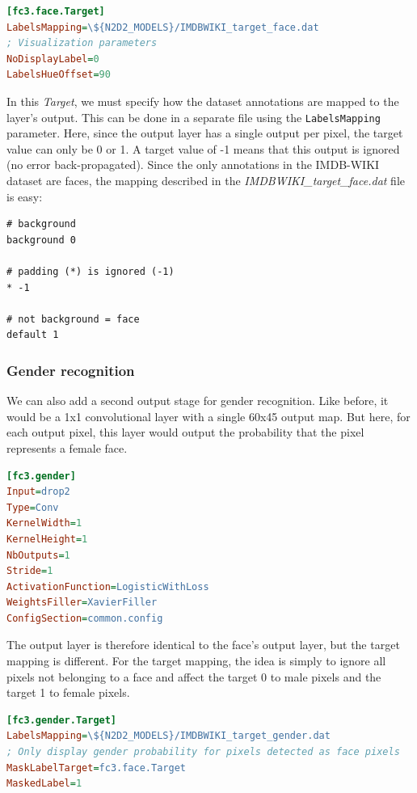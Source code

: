 \documentclass[a4paper,11pt,oneside]{article}
\begin{document}
\begin{lstlisting}[language=ini]
[fc3.face.Target]
LabelsMapping=\${N2D2_MODELS}/IMDBWIKI_target_face.dat
; Visualization parameters
NoDisplayLabel=0
LabelsHueOffset=90
\end{lstlisting}

In this \emph{Target}, we must specify how the dataset annotations are mapped to
the layer's output. This can be done in a separate file using the
\lstinline!LabelsMapping! parameter. Here, since the output layer has a single
output per pixel, the target value can only be 0 or 1. A target value of -1
means that this output is ignored (no error back-propagated). Since the only
annotations in the IMDB-WIKI dataset are faces, the mapping described in the
\emph{IMDBWIKI\_target\_face.dat} file is easy:

\begin{lstlisting}
# background
background 0

# padding (*) is ignored (-1)
* -1

# not background = face
default 1
\end{lstlisting}

\subsubsection{Gender recognition}

We can also add a second output stage for gender recognition. Like before, it
would be a 1x1 convolutional layer with a single 60x45 output map. But here, for
each output pixel, this layer would output the probability that the pixel
represents a female face.

\begin{lstlisting}[language=ini]
[fc3.gender]
Input=drop2
Type=Conv
KernelWidth=1
KernelHeight=1
NbOutputs=1
Stride=1
ActivationFunction=LogisticWithLoss
WeightsFiller=XavierFiller
ConfigSection=common.config
\end{lstlisting}

The output layer is therefore identical to the face's output layer, but the
target mapping is different. For the target mapping, the idea is simply to
ignore all pixels not belonging to a face and affect the target 0 to male pixels
and the target 1 to female pixels.

\begin{lstlisting}[language=ini]
[fc3.gender.Target]
LabelsMapping=\${N2D2_MODELS}/IMDBWIKI_target_gender.dat
; Only display gender probability for pixels detected as face pixels
MaskLabelTarget=fc3.face.Target
MaskedLabel=1
\end{lstlisting}
\end{document}
